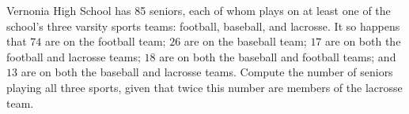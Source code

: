 Vernonia High School has 85 seniors, each of whom plays on at least one of the school’s three varsity sports teams: football, baseball, and lacrosse. It so happens that $74$ are on the football team; $26$ are on the baseball team; $17$ are on both the football and lacrosse teams; $18$ are on both the baseball and football teams; and $13$ are on both the baseball and lacrosse teams. Compute the number of seniors playing all three sports, given that twice this number are members of the lacrosse team.